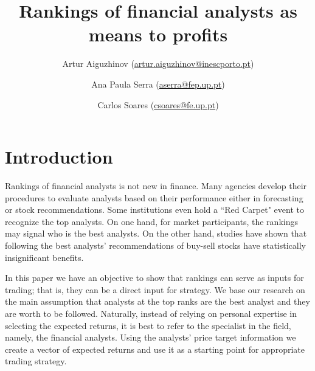\documentclass[12pt,a4paper]{article}\usepackage[]{graphicx}\usepackage[]{color}
\begin{document}

\title{Rankings of financial analysts as means to profits}
\author[1,2]{ Artur Aiguzhinov (\href{mailto:artur.aiguzhinov@inescporto.pt}{artur.aiguzhinov@inescporto.pt})}
 \author[1]{ Ana Paula Serra (\href{mailto:aserra@fep.up.pt}{aserra@fep.up.pt})}
 \author[2,3]{Carlos Soares (\href{mailto:csoares@fe.up.pt}{csoares@fe.up.pt})}


\onehalfspacing
\maketitle
\begin{abstract}

\end{abstract}
\doublespace







\section{Introduction}
\label{ch4-sec:introduction}


Rankings of financial analysts is not new in finance. Many agencies develop their procedures to evaluate analysts based on their performance either in forecasting or stock recommendations. Some institutions even hold a ``Red Carpet" event to recognize the top analysts. On one hand, for market participants, the rankings may signal who is the best analysts. On the other hand, studies have shown that following the best analysts' recommendations of buy-sell stocks have statistically insignificant benefits.

In this paper we have an objective to show that rankings can serve as inputs for trading; that is, they can be a direct input for strategy. We base our research on the main assumption that analysts at the top ranks are the best analyst and they are worth to be followed. Naturally, instead of relying on personal expertise in selecting the expected returns, it is best to refer to the specialist in the field, namely, the financial analysts. Using the analysts' price target information we  create a vector of expected returns and use it as a starting point for appropriate trading strategy.
\end{document}
